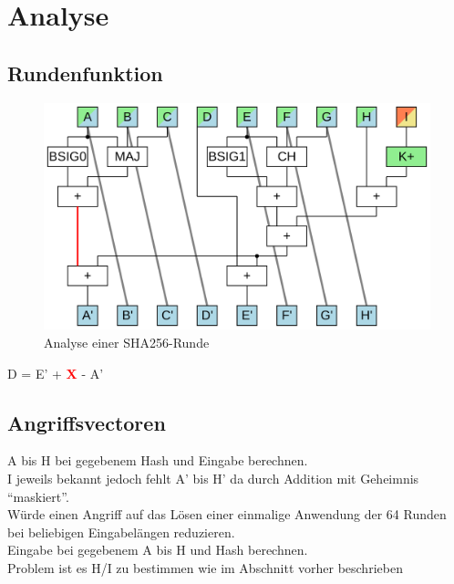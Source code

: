 \section{Analyse}


\subsection{Rundenfunktion}

\begin{figure}[ht]
  \centering
  \includegraphics[scale=0.4]{images/sha256coreA}
  \caption{Analyse einer SHA256-Runde}
  \label{fig:sha256coreA}
\end{figure}

D = E' + \textcolor{red}{\textbf{X}} - A'

\subsection{Angriffsvectoren}

A bis H bei gegebenem Hash und Eingabe berechnen.\\
I jeweils bekannt jedoch fehlt A' bis H' da durch Addition mit Geheimnis "`maskiert"'.\\
Würde einen Angriff auf das Lösen einer einmalige Anwendung der 64 Runden bei beliebigen Eingabelängen reduzieren.
~\\
Eingabe bei gegebenem A bis H und Hash berechnen.\\
Problem ist es H/I zu bestimmen wie im Abschnitt vorher beschrieben